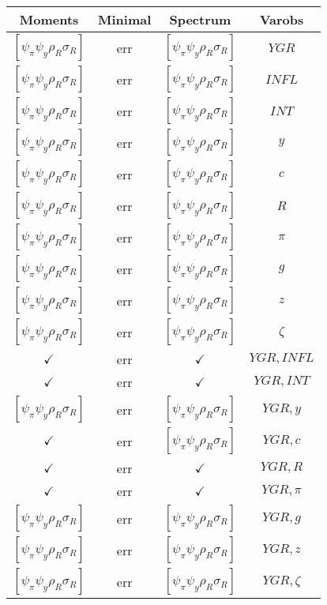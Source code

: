 \documentclass[a4paper,10pt]{article}
\begin{document}
\centering
\begin{longtable}{|c|c|c|c|}
\hline
Moments & Minimal & Spectrum & Varobs \\
\hline
$[\psi_\pi \psi_y \rho_R \sigma_R ]$ & err & $[\psi_\pi \psi_y \rho_R \sigma_R ]$ & ${YGR}$ \\
\hline
$[\psi_\pi \psi_y \rho_R \sigma_R ]$ & err & $[\psi_\pi \psi_y \rho_R \sigma_R ]$ & ${INFL}$ \\
\hline
$[\psi_\pi \psi_y \rho_R \sigma_R ]$ & err & $[\psi_\pi \psi_y \rho_R \sigma_R ]$ & ${INT}$ \\
\hline
$[\psi_\pi \psi_y \rho_R \sigma_R ]$ & err & $[\psi_\pi \psi_y \rho_R \sigma_R ]$ & ${y}$ \\
\hline
$[\psi_\pi \psi_y \rho_R \sigma_R ]$ & err & $[\psi_\pi \psi_y \rho_R \sigma_R ]$ & ${c}$ \\
\hline
$[\psi_\pi \psi_y \rho_R \sigma_R ]$ & err & $[\psi_\pi \psi_y \rho_R \sigma_R ]$ & ${R}$ \\
\hline
$[\psi_\pi \psi_y \rho_R \sigma_R ]$ & err & $[\psi_\pi \psi_y \rho_R \sigma_R ]$ & ${\pi}$ \\
\hline
$[\psi_\pi \psi_y \rho_R \sigma_R ]$ & err & $[\psi_\pi \psi_y \rho_R \sigma_R ]$ & ${g}$ \\
\hline
$[\psi_\pi \psi_y \rho_R \sigma_R ]$ & err & $[\psi_\pi \psi_y \rho_R \sigma_R ]$ & ${z}$ \\
\hline
$[\psi_\pi \psi_y \rho_R \sigma_R ]$ & err & $[\psi_\pi \psi_y \rho_R \sigma_R ]$ & ${\zeta}$ \\
\hline
$\checkmark$ & err & $\checkmark$ & ${YGR},{INFL}$ \\
\hline
$\checkmark$ & err & $\checkmark$ & ${YGR},{INT}$ \\
\hline
$[\psi_\pi \psi_y \rho_R \sigma_R ]$ & err & $[\psi_\pi \psi_y \rho_R \sigma_R ]$ & ${YGR},{y}$ \\
\hline
$\checkmark$ & err & $[\psi_\pi \psi_y \rho_R \sigma_R ]$ & ${YGR},{c}$ \\
\hline
$\checkmark$ & err & $\checkmark$ & ${YGR},{R}$ \\
\hline
$\checkmark$ & err & $\checkmark$ & ${YGR},{\pi}$ \\
\hline
$[\psi_\pi \psi_y \rho_R \sigma_R ]$ & err & $[\psi_\pi \psi_y \rho_R \sigma_R ]$ & ${YGR},{g}$ \\
\hline
$[\psi_\pi \psi_y \rho_R \sigma_R ]$ & err & $[\psi_\pi \psi_y \rho_R \sigma_R ]$ & ${YGR},{z}$ \\
\hline
$[\psi_\pi \psi_y \rho_R \sigma_R ]$ & err & $[\psi_\pi \psi_y \rho_R \sigma_R ]$ & ${YGR},{\zeta}$ \\

\end{longtable}
\end{document}

